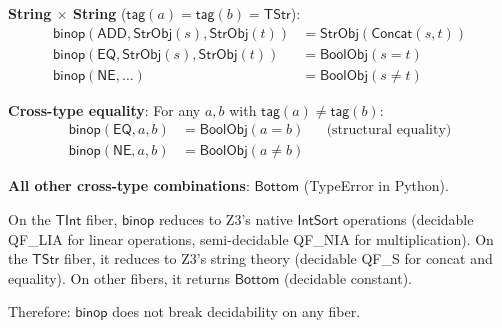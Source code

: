 \begin{definition}
\textbf{String $\times$ String} ($\mathsf{tag}(a) = \mathsf{tag}(b)
= \mathsf{TStr}$):
\begin{align}
  \mathsf{binop}(\mathsf{ADD}, \mathsf{StrObj}(s),
    \mathsf{StrObj}(t)) &= \mathsf{StrObj}(\mathsf{Concat}(s, t)) \\
  \mathsf{binop}(\mathsf{EQ}, \mathsf{StrObj}(s),
    \mathsf{StrObj}(t)) &= \mathsf{BoolObj}(s = t) \\
  \mathsf{binop}(\mathsf{NE}, \ldots) &= \mathsf{BoolObj}(s \neq t)
\end{align}

\textbf{Cross-type equality}: For any $a, b$ with
$\mathsf{tag}(a) \neq \mathsf{tag}(b)$:
\begin{align}
  \mathsf{binop}(\mathsf{EQ}, a, b) &= \mathsf{BoolObj}(a = b)
    && \text{(structural equality)} \\
  \mathsf{binop}(\mathsf{NE}, a, b) &= \mathsf{BoolObj}(a \neq b)
\end{align}

\textbf{All other cross-type combinations}: $\mathsf{Bottom}$
(TypeError in Python).
\end{definition}

\begin{proposition}
\label{prop:binop-decidable}
On the $\mathsf{TInt}$ fiber, $\mathsf{binop}$ reduces to Z3's
native $\mathsf{IntSort}$ operations (decidable QF\_LIA for linear
operations, semi-decidable QF\_NIA for multiplication).
On the $\mathsf{TStr}$ fiber, it reduces to Z3's string theory
(decidable QF\_S for concat and equality).
On other fibers, it returns $\mathsf{Bottom}$ (decidable constant).

Therefore: $\mathsf{binop}$ does not break decidability on any
fiber.
\end{proposition}

